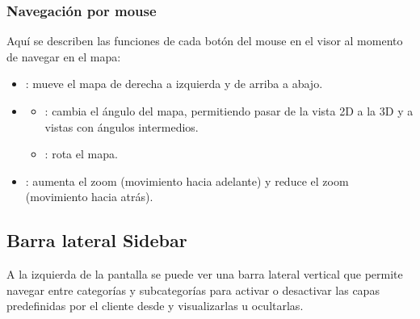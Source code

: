 \documentclass[a4paper,11pt,openany,spanish]{sphinxmanual}
\begin{document}
\subsubsection{Navegación por mouse}
\label{\detokenize{navigation/interfaz:navegacion-por-mouse}}
\sphinxAtStartPar
Aquí se describen las funciones de cada botón del mouse en el visor al momento de navegar en el mapa:
\begin{itemize}
\item {} 
\sphinxAtStartPar
{}: mueve el mapa de derecha a izquierda y de arriba a abajo.

\item {} \begin{description}
\begin{itemize}
\item {} 
\sphinxAtStartPar
{}: cambia el ángulo del mapa, permitiendo pasar de la vista 2D a la 3D y a vistas con ángulos intermedios.

\item {} 
\sphinxAtStartPar
{}: rota el mapa.

\end{itemize}

\end{description}

\item {} 
\sphinxAtStartPar
{}: aumenta el zoom (movimiento hacia adelante) y reduce el zoom (movimiento hacia atrás).

\end{itemize}

\sphinxstepscope


\subsection{Barra lateral \sphinxhyphen{} Sidebar}
\label{\detokenize{navigation/sidebar:barra-lateral-sidebar}}\label{\detokenize{navigation/sidebar::doc}}

\sphinxAtStartPar
A la izquierda de la pantalla se puede ver una barra lateral vertical que permite navegar entre categorías y subcategorías para activar o desactivar las capas predefinidas por el cliente desde  y visualizarlas u ocultarlas.
\end{document}
